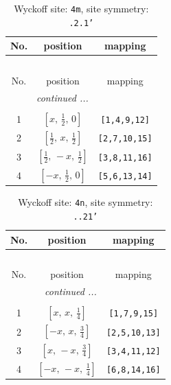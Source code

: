 \documentclass[fleqn,8pt]{jsarticle}
\begin{document}
\renewcommand{\arraystretch}{1.2}
\begin{longtable}{ccc}
\caption{Wyckoff site: {\tt 4m}, site symmetry: {\tt .2.1'}}
 \\
 \hline \hline
No. & position & mapping \\ \hline \endfirsthead

\multicolumn{2}{l}{\tablename\ \thetable{}} \\
 \hline \hline
No. & position & mapping \\ \hline \endhead

 \hline \hline
\multicolumn{2}{r}{\footnotesize\it continued ...} \\ \endfoot

 \hline \hline
\multicolumn{2}{r}{} \\ \endlastfoot

1 & $\left[ x,\, \frac{1}{2},\, 0 \right]$ & {\tt [1,4,9,12]} \\ \hline
2 & $\left[ \frac{1}{2},\, x,\, \frac{1}{2} \right]$ & {\tt [2,7,10,15]} \\ \hline
3 & $\left[ \frac{1}{2},\, - x,\, \frac{1}{2} \right]$ & {\tt [3,8,11,16]} \\ \hline
4 & $\left[ - x,\, \frac{1}{2},\, 0 \right]$ & {\tt [5,6,13,14]} \\
\end{longtable}
\renewcommand{\arraystretch}{1.2}
\begin{longtable}{ccc}
\caption{Wyckoff site: {\tt 4n}, site symmetry: {\tt ..21'}}
 \\
 \hline \hline
No. & position & mapping \\ \hline \endfirsthead

\multicolumn{2}{l}{\tablename\ \thetable{}} \\
 \hline \hline
No. & position & mapping \\ \hline \endhead

 \hline \hline
\multicolumn{2}{r}{\footnotesize\it continued ...} \\ \endfoot

 \hline \hline
\multicolumn{2}{r}{} \\ \endlastfoot

1 & $\left[ x,\, x,\, \frac{1}{4} \right]$ & {\tt [1,7,9,15]} \\ \hline
2 & $\left[ - x,\, x,\, \frac{3}{4} \right]$ & {\tt [2,5,10,13]} \\ \hline
3 & $\left[ x,\, - x,\, \frac{3}{4} \right]$ & {\tt [3,4,11,12]} \\ \hline
4 & $\left[ - x,\, - x,\, \frac{1}{4} \right]$ & {\tt [6,8,14,16]} \\
\end{longtable}
\end{document}
